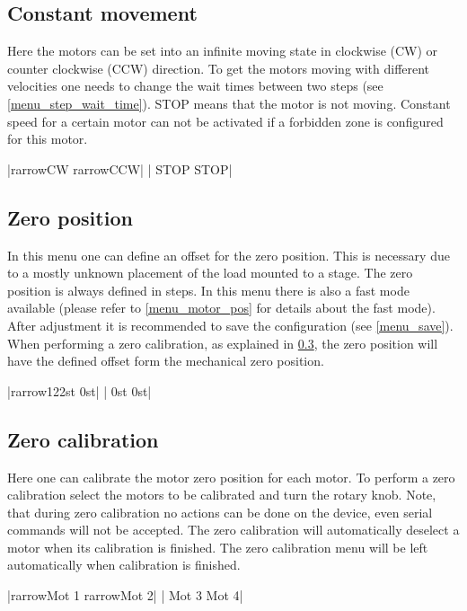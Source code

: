 \subsection{Constant movement}
Here the motors can be set into an infinite moving state in clockwise (CW) or counter clockwise (CCW) direction. To get the motors moving with different velocities one needs to change the wait times between two steps (see \ref{menu_step_wait_time}).
STOP means that the motor is not moving. Constant speed for a certain motor can not be activated if a forbidden zone is configured for this motor.
\begin{center}
  |{rarrow}CW     {rarrow}CCW|
             | STOP    STOP|
\end{center}

\subsection{Zero position}
In this menu one can define an offset for the zero position. This is necessary due to a mostly unknown placement of the load mounted to a stage. 
The zero position is always defined in steps. In this menu there is also a fast mode available (please refer to  \ref{menu_motor_pos} for details about the fast mode). After adjustment it is recommended to save the configuration (see \ref{menu_save}). When performing a zero calibration, as explained in \ref{menu_zero_cal}, the zero position will have the defined offset form the mechanical zero position.
\begin{center}
  |{rarrow}122st   0st|
             | 0st     0st|
\end{center}

\subsection{Zero calibration}
\label{menu_zero_cal}
Here one can calibrate the motor zero position for each motor. To perform a zero calibration select the motors to be calibrated and turn the rotary knob. Note, that during zero calibration no actions can be done on the device, even serial commands will not be accepted. The zero calibration will automatically deselect a motor when its calibration is finished. The zero calibration menu will be left automatically when calibration is finished.
\begin{center}
  |{rarrow}Mot 1  {rarrow}Mot 2|
             | Mot 3   Mot 4|
\end{center}

